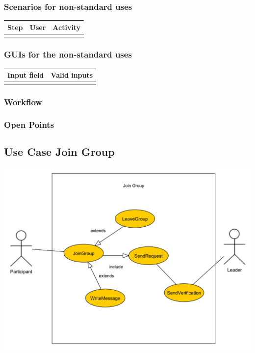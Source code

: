 \documentclass[12pt]{article}
\theoremstyle{definition}
\begin{document}
\subsubsection{Scenarios for non-standard uses}

\begin{tabular}{|l|l|l|}
\hline
Step & User & Activity \\ \hline
 & & \\ \hline
\end{tabular}

\subsubsection{GUIs for the non-standard uses}

\begin{tabular}{|l|l|}
\hline
Input field & Valid inputs \\ \hline
 &  \\ \hline
\end{tabular}

\subsubsection{Workflow}

\subsubsection{Open Points}
\subsection{Use Case Join Group}

\includegraphics[scale=.5]{JoinGroup.pdf}
\end{document}
